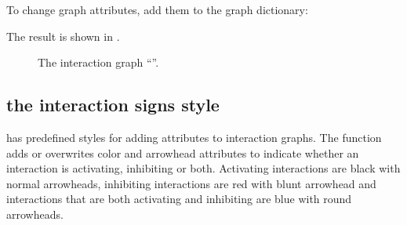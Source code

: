 \documentclass[letterpaper,10pt,english]{sphinxmanual}
\begin{document}
To change graph attributes, add them to the graph dictionary:

\begin{sphinxVerbatim}[commandchars=\\\{\}]
\PYG{p}{[}\PYG{p}{]}  
\PYG{p}{[}\PYG{p}{]}  
\PYG{p}{[}\PYG{p}{]}  
 
\end{sphinxVerbatim}

The result is shown in {\hyperref[\detokenize{Manual:figure02}]{}}.

\begin{figure}[htbp]
\centering
\capstart

\noindent{}
\caption{The interaction graph “”.}\label{\detokenize{Manual:figure02}}\label{\detokenize{Manual:id7}}\end{figure}


\subsection{the interaction signs style}
\label{\detokenize{Manual:the-interaction-signs-style}}
 has predefined styles for adding attributes to interaction graphs.
The function {\hyperref[\detokenize{InteractionGraphs:add-style-interactionsigns}]{}} adds or overwrites color and arrowhead attributes to indicate whether an interaction is activating, inhibiting or both.
Activating interactions are black with normal arrowheads,
inhibiting interactions are red with blunt arrowhead and
interactions that are both activating and inhibiting are blue with round arrowheads.
\end{document}

